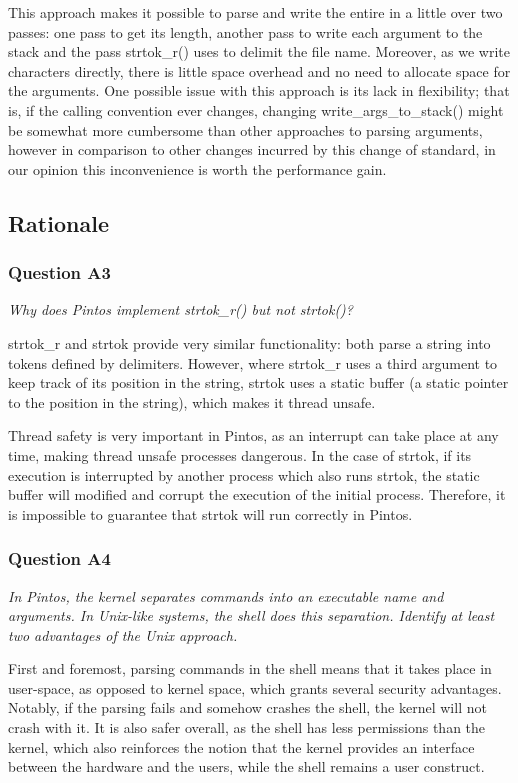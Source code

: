 This approach makes it possible to parse and write the entire in a little over two passes: one pass to get its length, another pass to write each argument to the stack and the pass strtok\_r() uses to delimit the file name.
Moreover, as we write characters directly, there is little space overhead and no need to allocate space for the arguments.
One possible issue with this approach is its lack in flexibility; that is, if the calling convention ever changes, changing write\_args\_to\_stack() might be somewhat more cumbersome than other approaches to parsing arguments, however in comparison to other changes incurred by this change of standard, in our opinion this inconvenience is worth the performance gain.

\subsection{Rationale}
\subsubsection*{Question A3} %
\textit{Why does Pintos implement strtok\_r() but not strtok()?}

strtok\_r and strtok provide very similar functionality: both parse a string into tokens defined by delimiters.
However, where strtok\_r uses a third argument to keep track of its position in the string, strtok uses a static buffer (a static pointer to the position in the string), which makes it thread unsafe.

Thread safety is very important in Pintos, as an interrupt can take place at any time, making thread unsafe processes dangerous. In the case of strtok, if its execution is interrupted by another process which also runs strtok, the static buffer will modified and corrupt the execution of the initial process. Therefore, it is impossible to guarantee that strtok will run correctly in Pintos.

\subsubsection*{Question A4} %
\textit{In Pintos, the kernel separates commands into an executable name and arguments.  In Unix-like systems, the shell does this separation.  Identify at least two advantages of the Unix approach.}

First and foremost, parsing commands in the shell means that it takes place in user-space, as opposed to kernel space, which grants several security advantages. Notably, if the parsing fails and somehow crashes the shell, the kernel will not crash with it. It is also safer overall, as the shell has less permissions than the kernel, which also reinforces the notion that the kernel provides an interface between the hardware and the users, while the shell remains a user construct.

